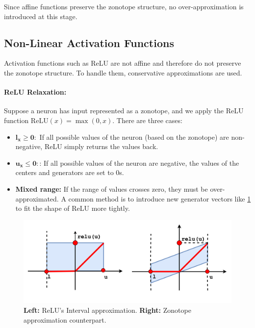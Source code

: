 \documentclass[oneside,11pt,dvipsnames]{book}
\numberwithin{equation}{section}
\theoremstyle{definition}
\theoremstyle{remark}
\begin{document}
Since affine functions preserve the zonotope structure, no over-approximation is introduced at this stage.

\subsection{Non-Linear Activation Functions}

Activation functions such as ReLU are not affine and therefore do not preserve the zonotope structure. To handle them, conservative approximations are used.

\paragraph{ReLU Relaxation:} Suppose a neuron has input represented as a zonotope, and we apply the ReLU function \(\text{ReLU}(x) = \max(0, x)\). There are three cases:

\begin{itemize}
    \item \(\mathbf{l_x \geq 0:}\) If all possible values of the neuron (based on the zonotope) are non-negative, ReLU simply returns the values back.
    \item  \(\mathbf{u_x \leq 0:}\): If all possible values of the neuron are negative, the values of the centers and generators are set to 0s.
    \item \textbf{Mixed range:} If the range of values crosses zero, they must be over-approximated. A common method is to introduce new generator vectors like \ref{fig:zonotope_vs_interval} to fit the shape of ReLU more tightly.
\end{itemize}

\begin{figure}
    \centering
    \includegraphics[width=1\linewidth]{figure/zonotope_vs_interval.png}
    \caption{\textbf{Left:} ReLU's Interval approximation. \textbf{Right:} Zonotope approximation counterpart.}
    \label{fig:zonotope_vs_interval}
\end{figure}
\end{document}
